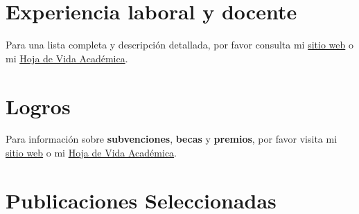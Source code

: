 \documentclass[11pt,a4paper,]{awesome-cv}
\begin{document}
\section{Experiencia laboral y
docente}\label{experiencia-laboral-y-docente}

Para una lista completa y descripción detallada, por favor consulta mi
\href{https://jdleongomez.info/es/profile/\#experience}{sitio web} o mi
\href{https://jdleongomez.info/es/files/jdl_cv_es.pdf}{Hoja de Vida
Académica}.

\begin{cventries}
    \vspace{-4.0mm}
\end{cventries}

\section{Logros}\label{logros}

Para información sobre \textbf{subvenciones}, \textbf{becas} y
\textbf{premios}, por favor visita mi
\href{https://jdleongomez.info/es/profile/\#accomplishments}{sitio web}
o mi \href{https://jdleongomez.info/es/files/jdl_cv_es.pdf}{Hoja de Vida
Académica}.

\section{Publicaciones Seleccionadas}\label{publicaciones-seleccionadas}
\end{document}
